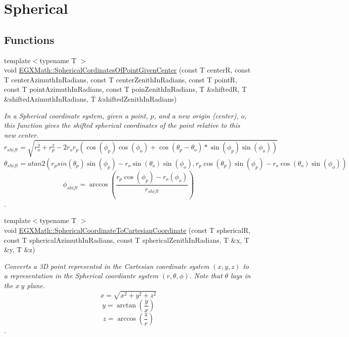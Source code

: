 \hypertarget{group___e_g_x_math-_conversions-_coordinate_conversions-3_d-_spherical}{}\section{Spherical}
\label{group___e_g_x_math-_conversions-_coordinate_conversions-3_d-_spherical}
\subsection*{Functions}
\begin{DoxyCompactItemize}
\item 
{\footnotesize template$<$typename T $>$ }\\void \mbox{\hyperlink{group___e_g_x_math-_conversions-_coordinate_conversions-3_d-_spherical_gaa9b50c4837e1cbea569de6f7bc90a3b6}{E\+G\+X\+Math\+::\+Spherical\+Cordinates\+Of\+Point\+Given\+Center}} (const T centerR, const T center\+Azimuth\+In\+Radians, const T center\+Zenith\+In\+Radians, const T pointR, const T point\+Azimuth\+In\+Radians, const T poin\+Zenith\+In\+Radians, T \&shiftedR, T \&shifted\+Azimuth\+In\+Radians, T \&shifted\+Zenith\+In\+Radians)
\begin{DoxyCompactList}\small\item\em In a Spherical coordinate system, given a point, $p$, and a new origin (center), $o$, this function gives the shifted spherical coordinates of the point relative to this new center. \[ r_{shift} = \sqrt{r_o^2+r_p^2 - 2 r_o r_p ( \cos(\phi_p) \cos(\phi_o) + \cos(\theta_p-\theta_o) * \sin(\phi_p) \sin(\phi_o))}\] \[ \theta_{shift} = atan2( r_p sin(\theta_p) \sin(\phi_p) - r_o \sin(\theta_o) \sin(\phi_o) , r_p \cos(\theta_p) \sin(\phi_p) - r_o \cos(\theta_o) \sin(\phi_o) )\] \[ \phi_{shift} = \arccos(\frac{r_p \cos(\phi_p) - r_o (\phi_o)}{r_{shift}}) \]. \end{DoxyCompactList}\item 
{\footnotesize template$<$typename T $>$ }\\void \mbox{\hyperlink{group___e_g_x_math-_conversions-_coordinate_conversions-3_d-_spherical_ga3141fcb31751df8a24b5474de768b375}{E\+G\+X\+Math\+::\+Spherical\+Coordinate\+To\+Cartesian\+Coordinate}} (const T sphericalR, const T spherical\+Azimuth\+In\+Radians, const T spherical\+Zenith\+In\+Radians, T \&x, T \&y, T \&z)
\begin{DoxyCompactList}\small\item\em Converts a 3D point represented in the Cartesian coordinate system $(x,y,z)$ to a representation in the Spherical coordiante system $(r,\theta,\phi)$. Note that $\theta$ lays in the $x\ y$ plane. \[ x = \sqrt{x^2+y^2+z^2} \] \[ y = \arctan(\frac{y}{x}) \] \[ z = \arccos(\frac{z}{r}) \]. \end{DoxyCompactList}\item 

\end{DoxyCompactItemize}
